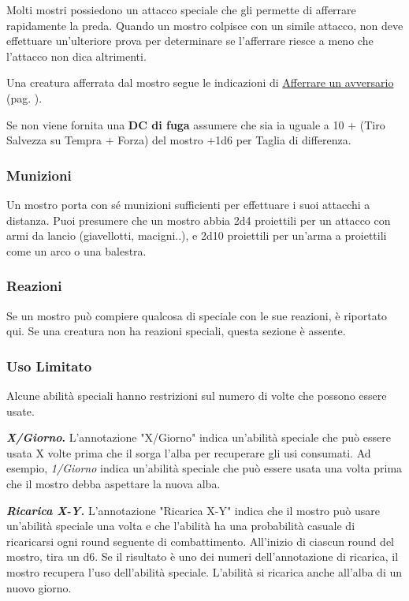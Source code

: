 \begin{multicols}{2}
Molti mostri possiedono un attacco speciale che gli permette di afferrare rapidamente la preda. Quando un mostro colpisce con un simile attacco, non deve effettuare un'ulteriore prova per determinare se l'afferrare riesce a meno che l'attacco non dica altrimenti.

Una creatura afferrata dal mostro segue le indicazioni di \hyperlink{afferrareunavversario}{Afferrare un avversario} (pag. \pageref{afferrareunavversario}).

Se non viene fornita una \textbf{DC di fuga} assumere che sia ia uguale a 10 + (Tiro Salvezza su Tempra  + Forza) del mostro +1d6 per Taglia di differenza.

\subsubsection{Munizioni}

Un mostro porta con sé munizioni sufficienti per effettuare i suoi attacchi a distanza. Puoi presumere che un mostro abbia 2d4 proiettili per un attacco con armi da lancio (giavellotti, macigni..), e 2d10 proiettili per un'arma a proiettili come un arco o una balestra.


\subsubsection{Reazioni}

Se un mostro può compiere qualcosa di speciale con le sue reazioni, è riportato qui. Se una creatura non ha reazioni speciali, questa sezione è assente.

\subsubsection{Uso Limitato}

Alcune abilità speciali hanno restrizioni sul numero di volte che possono essere usate.

\textbf{\emph{X/Giorno}.} L'annotazione "X/Giorno" indica un'abilità speciale che può essere usata X volte prima che il sorga l'alba per recuperare gli usi consumati. Ad esempio, \emph{1/Giorno} indica un'abilità speciale che può essere usata una volta prima che il mostro debba aspettare la nuova alba.

\emph{\textbf{Ricarica X-Y.}} L'annotazione "Ricarica X-Y" indica che il mostro può usare un'abilità speciale una volta e che l'abilità ha una probabilità casuale di ricaricarsi ogni round seguente di combattimento. All'inizio di ciascun round del mostro, tira un d6. Se il risultato è uno dei numeri dell'annotazione di ricarica, il mostro recupera l'uso dell'abilità speciale. L'abilità si ricarica anche all'alba di un nuovo giorno.


\end{multicols}
